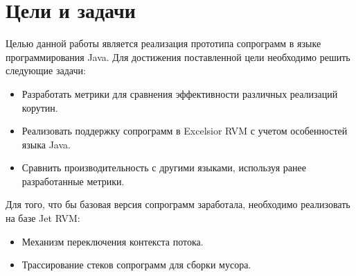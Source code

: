 \section{Цели и задачи}
	Целью данной работы является реализация прототипа сопрограмм в языке программирования Java. Для
	достижения поставленной цели необходимо решить следующие задачи:
	\begin{itemize}
		\item Разработать метрики для сравнения эффективности различных реализаций корутин.
		\item Реализовать поддержку сопрограмм в Excelsior RVM с учетом особенностей языка Java. 
		\item Сравнить производительность с другими языками, используя ранее разработанные метрики.
	\end{itemize}

	Для того, что бы базовая версия сопрограмм заработала, необходимо реализовать на базе Jet RVM:
	\begin{itemize}
		\item Механизм переключения контекста потока.
		\item Трассирование стеков сопрограмм для сборки мусора.
	\end{itemize}
	  
\clearpage